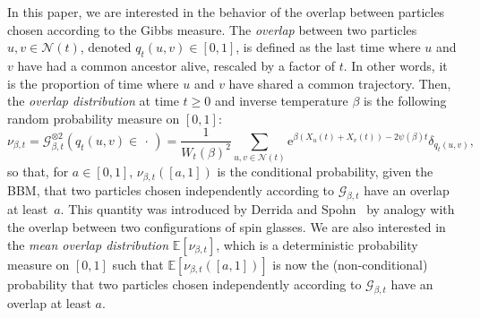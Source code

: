\documentclass[10pt]{amsart}
\theoremstyle{definition}\newtheorem{defi}[theo]{Definition}\newtheorem{rema}[theo]{Remark}\newtheorem{exam}[theo]{Example}\newtheorem{exem}[theo]{Example}\newtheorem{nota}[theo]{Notation}
\newcommand{\e}{\mathrm{e}}
\newcommand{\E}{\mathbb{E}}
\newcommand\1{\mathds{1}}
\newcommand{\cG}{\mathcal{G}}
\newcommand{\cN}{\mathcal{N}}
\begin{document}
In this paper, we are interested in the behavior of the overlap between particles chosen according to the Gibbs measure. The \emph{overlap} between two particles ${u, v \in \cN(t)}$, denoted $q_t(u, v) \in [0,1]$, is defined as the last time where $u$ and $v$ have had a common ancestor alive, rescaled by a factor of $t$. In other words, it is the proportion of time where $u$ and $v$ have shared a common trajectory. Then, the \emph{overlap distribution} at time $t \geq 0$ and inverse temperature $\beta$ is the following random probability measure on $[0,1]$:
\begin{equation}\label{eq:def_overlap_dist}
\nu_{\beta, t} = \cG_{\beta, t}^{\otimes 2}(q_t(u, v) \in \,\cdot\,) = \frac{1}{W_t(\beta)^2} \sum_{u, v \in \cN(t)} \e^{\beta(X_u(t) + X_v(t)) - 2 \psi(\beta) t} \delta_{q_t(u, v)},
\end{equation}
so that, for $a \in [0,1]$, $\nu_{\beta, t}([a,1])$ is the conditional probability, given the BBM, that two particles chosen independently according to $\cG_{\beta,t}$ have an overlap at least~$a$. This quantity was introduced by Derrida and Spohn~\cite{DerridaSpohn1988} by analogy with the overlap between two configurations of spin glasses. We are also interested in the \emph{mean overlap distribution} $\E[\nu_{\beta, t}]$, which is a deterministic probability measure on $[0,1]$ such that $\E[\nu_{\beta, t}([a,1])]$ is now the (non-conditional) probability that two particles chosen independently according to $\cG_{\beta,t}$ have an overlap at least $a$.
\end{document}

